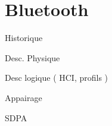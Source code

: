 \section{Bluetooth}
\begin{frame}
Historique
\end{frame}

\begin{frame}
Desc. Physique
\end{frame}

\begin{frame}
Desc logique ( HCI, profils )
\end{frame}

\begin{frame}
Appairage
\end{frame}

\begin{frame}
SDPA
\end{frame}
